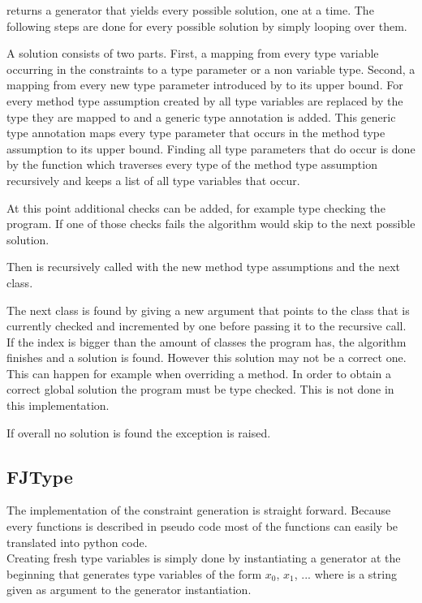  returns a generator that yields every possible solution, one at a time. The following steps are done for every possible solution by simply looping over them.

A solution consists of two parts. First, a mapping from every type variable occurring in the constraints to a type parameter or a non variable type. Second, a mapping from every new type parameter introduced by  to its upper bound.
For every method type assumption created by  all type variables are replaced by the type they are mapped to and
a generic type annotation is added. This generic type annotation maps every type parameter that occurs in the method type assumption to its upper bound.
Finding all type parameters that do occur is done by the function  which traverses every type of the method type assumption recursively and keeps a list of all type variables that occur.

At this point additional checks can be added, for example type checking the program. If one of those checks fails the algorithm would skip to the next possible solution.

Then  is recursively called with the new method type assumptions and the next class.

The next class is found by giving  a new argument  that points to the class that is currently checked and incremented by one before passing it to the recursive call.
If the index is bigger than the amount of classes the program has, the algorithm finishes and a solution is found.
However this solution may not be a correct one. This can happen for example when overriding a method. In order to obtain a correct global solution
the program must be type checked. This is not done in this implementation.

If overall no solution is found the exception  is raised.

\subsection{FJType}
The implementation of the constraint generation is straight forward. Because every functions is described in pseudo code most of the functions can easily be translated into python code. \\
Creating fresh type variables is simply done by instantiating a generator at the beginning that generates type variables of the form $x_0$, $x_1$, ... where  is a string given as argument to the generator instantiation. \\

